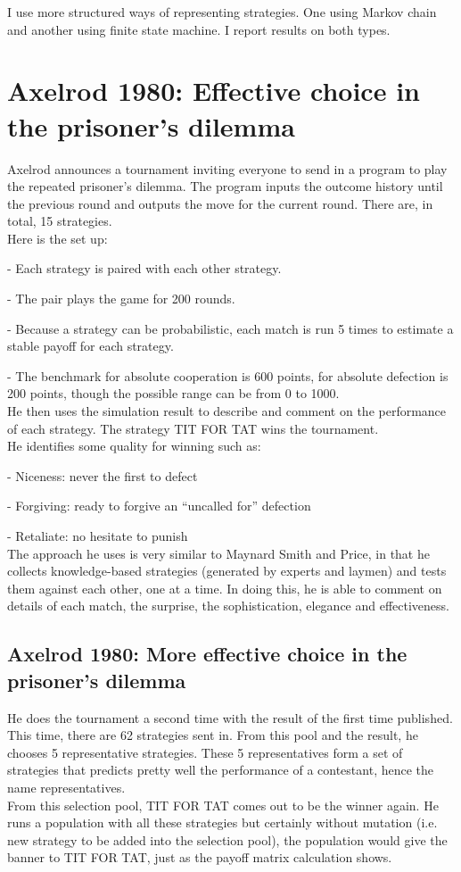 \documentclass[12.5pt]{report}
\begin{document}
I use more structured ways of representing strategies. One using Markov chain and another using finite state machine. I report results on both types.

\section{Axelrod 1980: Effective choice in the prisoner’s dilemma}
Axelrod announces a tournament inviting everyone to send in a program to play the repeated prisoner’s dilemma. The program inputs the outcome history until the previous round and outputs the move for the current round. There are, in total, 15 strategies. \\

Here is the set up:

- Each strategy is paired with each other strategy. 

- The pair plays the game for 200 rounds.

- Because a strategy can be probabilistic, each match is run 5 times to estimate a stable payoff for each strategy.  

- The benchmark for absolute cooperation is 600 points, for absolute defection is 200 points, though the possible range can be from 0 to 1000.\\

He then uses the simulation result to describe and comment on the performance of each strategy. The strategy TIT FOR TAT wins the tournament. \\

He identifies some quality for winning such as: 

- Niceness: never the first to defect

- Forgiving: ready to forgive an “uncalled for” defection

- Retaliate: no hesitate to punish\\

The approach he uses is very similar to Maynard Smith and Price, in that he collects knowledge-based strategies (generated by experts and laymen) and tests them against each other, one at a time. In doing this, he is able to comment on details of each match, the surprise, the sophistication, elegance and effectiveness.

\subsection{Axelrod 1980: More effective choice in the prisoner’s dilemma}
He does the tournament a second time with the result of the first time published. This time, there are 62 strategies sent in. From this pool and the result, he chooses 5 representative strategies. These 5 representatives form a set of strategies that predicts pretty well the performance of a contestant, hence the name representatives. \\
From this selection pool, TIT FOR TAT comes out to be the winner again. He runs a population with all these strategies but certainly without mutation (i.e. new strategy to be added into the selection pool), the population would give the banner to TIT FOR TAT, just as the payoff matrix calculation shows.
\end{document}
